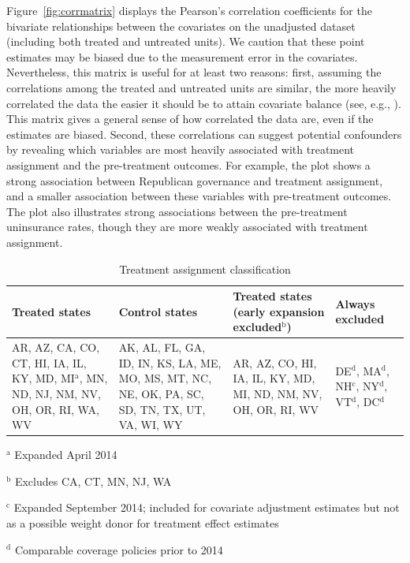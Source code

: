 Figure~\ref{fig:corrmatrix} displays the Pearson's correlation coefficients for the bivariate relationships between the covariates on the unadjusted dataset (including both treated and untreated units). We caution that these point estimates may be biased due to the measurement error in the covariates. Nevertheless, this matrix is useful for at least two reasons: first, assuming the correlations among the treated and untreated units are similar, the more heavily correlated the data the easier it should be to attain covariate balance (see, e.g., \cite{d2021overlap}). This matrix gives a general sense of how correlated the data are, even if the estimates are biased. Second, these correlations can suggest potential confounders by revealing which variables are most heavily associated with treatment assignment and the pre-treatment outcomes. For example, the plot shows a strong association between Republican governance and treatment assignment, and a smaller association between these variables with pre-treatment outcomes. The plot also illustrates strong associations between the pre-treatment uninsurance rates, though they are more weakly associated with treatment assignment. 

\begin{table}[h!]\label{tab:txassign}\caption{Treatment assignment classification}
\centering
\hline 
\begin{tabularx}{\textwidth}{|X|X|X|X|} \\ 
Treated states & Control states & Treated states (early expansion excluded$^\textrm{b}$) & Always excluded \\ 
\hline
AR, AZ, CA, CO, CT, HI, IA, IL, KY, MD, MI$^\textrm{a}$, MN, ND, NJ, NM, NV, OH, OR, RI, WA, WV & AK, AL, FL, GA, ID, IN, KS, LA, ME, MO, MS, MT, NC, NE, OK, PA, SC, SD, TN, TX, UT, VA, WI, WY & AR, AZ, CO, HI, IA, IL, KY, MD, MI, ND, NM, NV, OH, OR, RI, WV & DE$^\textrm{d}$, MA$^\textrm{d}$, NH$^\textrm{c}$, NY$^\textrm{d}$, VT$^\textrm{d}$, DC$^\textrm{d}$\\ 
\hline 
\end{tabularx} {
     \vspace{1ex} }
     {\raggedright $^\textrm{a}$ Expanded April 2014 \par 
     \raggedright $^\textrm{b}$ Excludes CA, CT, MN, NJ, WA \par 
     \raggedright $^\textrm{c}$ Expanded September 2014; included for covariate adjustment estimates but not as a possible weight donor for treatment effect estimates \par 
    \raggedright $^\textrm{d}$ Comparable coverage policies prior to 2014 
    \par}
\end{table}


